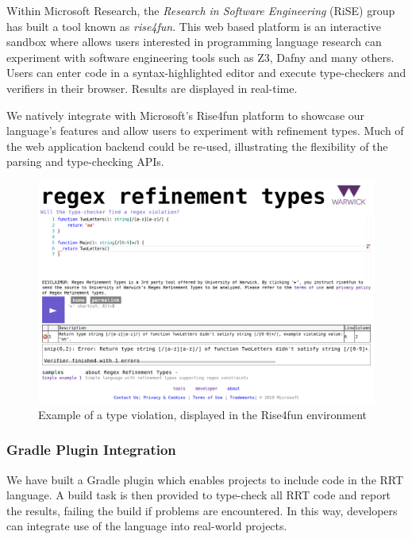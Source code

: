 \documentclass[a4paper,openany,12pt]{book}
\begin{document}
Within Microsoft Research, the \emph{Research in Software Engineering} (RiSE) group has built a tool known as
\emph{rise4fun}.
This web based platform is an interactive sandbox where allows users interested in programming language research can
experiment with software engineering tools such as Z3, Dafny and many others.
Users can enter code in a syntax-highlighted editor and execute type-checkers and verifiers in their browser.
Results are displayed in real-time.

We natively integrate with Microsoft's Rise4fun platform to showcase our language's features and allow users to
experiment with refinement types.
Much of the web application backend could be re-used, illustrating the flexibility of the parsing and type-checking
APIs.

\begin{figure}[H]
    \begin{MyMdframed}
        \vspace{0.5em}
        
        
        \caption{\label{figure:r4f}Example of a type violation, displayed in the Rise4fun environment}
        \vspace{0.5em}
        \captionsetup{style=default}
        
        \centering \includegraphics[width=0.9\linewidth]{rise4fun.png}
    \end{MyMdframed}
\end{figure}

\subsubsection{Gradle Plugin Integration}

We have built a Gradle plugin which enables projects to include code in the RRT language.
A build task is then provided to type-check all RRT code and report the results, failing the build if problems are
encountered.
In this way, developers can integrate use of the language into real-world projects.
\end{document}
